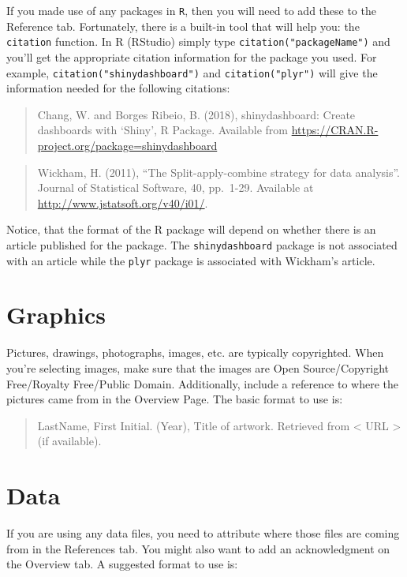 \documentclass[
]{book}
\begin{document}
If you made use of any packages in \texttt{R}, then you will need to add these to the Reference tab. Fortunately, there is a built-in tool that will help you: the \texttt{citation} function. In R (RStudio) simply type \texttt{citation("packageName")} and you'll get the appropriate citation information for the package you used. For example, \texttt{citation("shinydashboard")} and \texttt{citation("plyr")} will give the information needed for the following citations:

\begin{quote}
Chang, W. and Borges Ribeio, B. (2018), shinydashboard: Create dashboards with `Shiny', R Package. Available from \url{https://CRAN.R-project.org/package=shinydashboard}
\end{quote}

\begin{quote}
Wickham, H. (2011), ``The Split-apply-combine strategy for data analysis''. Journal of Statistical Software, 40, pp.~1-29. Available at \url{http://www.jstatsoft.org/v40/i01/}.
\end{quote}

Notice, that the format of the R package will depend on whether there is an article published for the package. The \texttt{shinydashboard} package is not associated with an article while the \texttt{plyr} package is associated with Wickham's article.

\hypertarget{graphics}{%
\section{Graphics}\label{graphics}}

Pictures, drawings, photographs, images, etc. are typically copyrighted. When you're selecting images, make sure that the images are Open Source/Copyright Free/Royalty Free/Public Domain. Additionally, include a reference to where the pictures came from in the Overview Page. The basic format to use is:

\begin{quote}
LastName, First Initial. (Year), Title of artwork. Retrieved from \textless{} URL \textgreater{} (if available).
\end{quote}

\hypertarget{data}{%
\section{Data}\label{data}}

If you are using any data files, you need to attribute where those files are coming from in the References tab. You might also want to add an acknowledgment on the Overview tab. A suggested format to use is:
\end{document}
